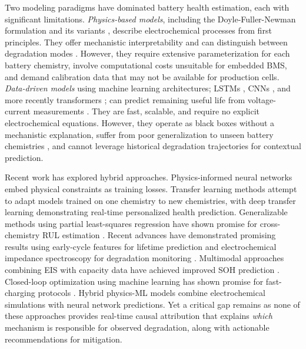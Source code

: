 \documentclass[5p,times,authoryear]{elsarticle}
\begin{document}
Two modeling paradigms have dominated battery health estimation, each with significant limitations.
\textit{Physics-based models}, including the Doyle-Fuller-Newman formulation \citep{doyle1993modeling} and its variants \citep{plett2015battery}, describe electrochemical processes from first principles. They offer mechanistic interpretability and can distinguish between degradation modes \citep{jokar2016review}. However, they require extensive parameterization for each battery chemistry, involve computational costs unsuitable for embedded BMS, and demand calibration data that may not be available for production cells.
\textit{Data-driven models} using machine learning architectures; LSTMs \citep{chemali2017long}, CNNs \citep{shen2019deep}, and more recently transformers \citep{chen2022transformer, park2025transformer}; can predict remaining useful life from voltage-current measurements \citep{roman2021machine, severson2019nature}. They are fast, scalable, and require no explicit electrochemical equations. However, they operate as black boxes without a mechanistic explanation, suffer from poor generalization to unseen battery chemistries \citep{liu2023transfer}, and cannot leverage historical degradation trajectories for contextual prediction.

Recent work has explored hybrid approaches. Physics-informed neural networks \citep{raissi2019physics} embed physical constraints as training losses. Transfer learning methods \citep{liu2023transfer, che2022battery, zhu2022transfer} attempt to adapt models trained on one chemistry to new chemistries, with deep transfer learning demonstrating real-time personalized health prediction. Generalizable methods using partial least-squares regression have shown promise for cross-chemistry RUL estimation \citep{wang2024generalizable}. Recent advances have demonstrated promising results using early-cycle features for lifetime prediction \citep{sugiarto2025temperature} and electrochemical impedance spectroscopy for degradation monitoring \citep{hu2023eis}. Multimodal approaches combining EIS with capacity data have achieved improved SOH prediction \citep{chen2026multimodal}. Closed-loop optimization using machine learning has shown promise for fast-charging protocols \citep{attia2020closedloop}. Hybrid physics-ML models \citep{li2022physics, thelen2022integrating} combine electrochemical simulations with neural network predictions.
Yet a critical gap remains as none of these approaches provides real-time causal attribution that explains \textit{which} mechanism is responsible for observed degradation, along with actionable recommendations for mitigation.
\end{document}
